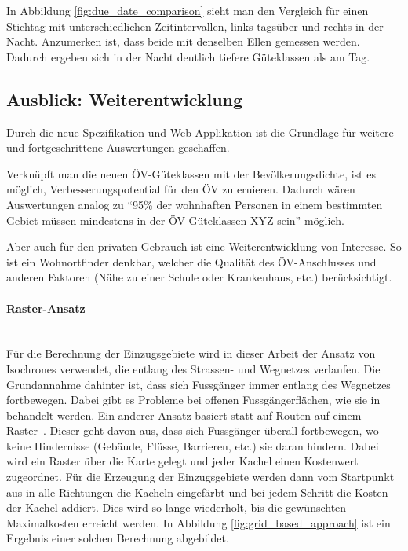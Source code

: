In Abbildung \ref{fig:due_date_comparison} sieht man den Vergleich für einen Stichtag mit unterschiedlichen Zeitintervallen, links tagsüber und rechts in der Nacht.
Anzumerken ist, dass beide mit denselben Ellen gemessen werden.
Dadurch ergeben sich in der Nacht deutlich tiefere Güteklassen als am Tag.

\subsection{Ausblick: Weiterentwicklung}
\label{Resultate:Ausblick: Weiterentwicklung}

Durch die neue Spezifikation und Web-Applikation ist die Grundlage für weitere und fortgeschrittene Auswertungen geschaffen.

Verknüpft man die neuen \acs{ÖV}-Güteklassen mit der Bevölkerungsdichte, ist es möglich, Verbesserungspotential für den \acs{ÖV} zu eruieren.
Dadurch wären Auswertungen analog zu "`95\% der wohnhaften Personen in einem bestimmten Gebiet müssen mindestens in der \acs{ÖV}-Güteklassen XYZ sein"' möglich.

Aber auch für den privaten Gebrauch ist eine Weiterentwicklung von Interesse.
So ist ein Wohnortfinder denkbar, welcher die Qualität des \acs{ÖV}-Anschlusses und anderen Faktoren (Nähe zu einer Schule oder Krankenhaus, etc.) berücksichtigt.

\paragraph{Raster-Ansatz}~\\
Für die Berechnung der Einzugsgebiete wird in dieser Arbeit der Ansatz von \glspl{Isochrone} verwendet, die entlang des Strassen- und Wegnetzes verlaufen.
Die Grundannahme dahinter ist, dass sich Fussgänger immer entlang des Wegnetzes fortbewegen.
Dabei gibt es Probleme bei offenen Fussgängerflächen, wie sie in~\cite{plaza_route} behandelt werden.
Ein anderer Ansatz basiert statt auf Routen auf einem Raster~\cite{pedestrian_accessibility_planning}. Dieser geht davon aus, dass sich Fussgänger überall fortbewegen, wo keine Hindernisse (Gebäude, Flüsse, Barrieren, etc.) sie daran hindern.
Dabei wird ein Raster über die Karte gelegt und jeder Kachel einen Kostenwert zugeordnet.
Für die Erzeugung der Einzugsgebiete werden dann vom Startpunkt aus in alle Richtungen die Kacheln eingefärbt und bei jedem Schritt die Kosten der Kachel addiert.
Dies wird so lange wiederholt, bis die gewünschten Maximalkosten erreicht werden.
In Abbildung \ref{fig:grid_based_approach} ist ein Ergebnis einer solchen Berechnung abgebildet.

